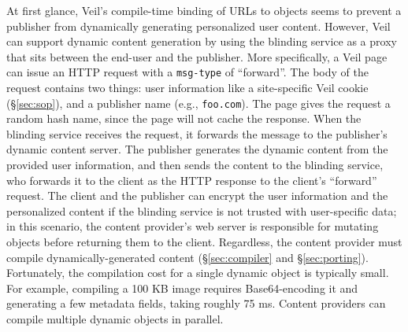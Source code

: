 % 
%



\label{sec:dynamic}

At first glance, Veil's compile-time binding of
URLs to objects seems to prevent a publisher
from dynamically generating personalized user
content. However, Veil can support dynamic
content generation by using the blinding
service as a proxy that sits between the
end-user and the publisher. More specifically,
a Veil page can issue an HTTP request with
a \texttt{msg-type} of ``forward''. The body
of the request contains two things: user information
like a site-specific Veil cookie (\S\ref{sec:sop}),
and a publisher name (e.g., \texttt{foo.com}).
The page gives the request a random hash name,
since the page will not cache the response.
When the blinding service receives the request,
it forwards the message to the publisher's
dynamic content server. The publisher generates
the dynamic content from the provided user
information, and then sends the content to the
blinding service, who forwards it to the client
as the HTTP response to the client's ``forward''
request. The client and the publisher can encrypt
the user information and the personalized content
if the blinding service is not trusted with
user-specific data; in this scenario, the content provider's web server
is responsible for mutating objects before returning
them to the client. Regardless, the content provider
must compile dynamically-generated content (\S\ref{sec:compiler}
and \S\ref{sec:porting}). Fortunately,
the compilation cost for a single dynamic object
is typically small. For example, compiling a
100 KB image requires Base64-encoding it and
generating a few metadata fields, taking roughly
75 ms. Content providers can compile multiple
dynamic objects in parallel.

